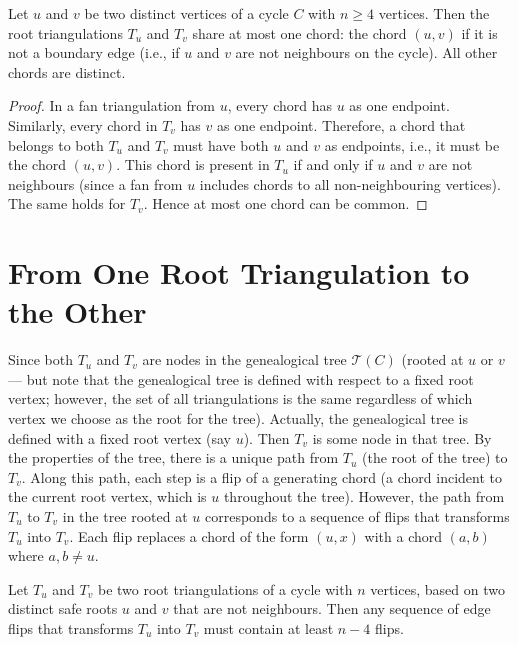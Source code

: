 \begin{lemma}
    \label{lem:chord_difference}
    Let \(u\) and \(v\) be two distinct vertices of a cycle \(C\) with \(n \ge 4\) vertices. 
    Then the root triangulations \(T_u\) and \(T_v\) share at most one chord: the chord \((u, v)\) if it is not a boundary edge (i.e., if \(u\) and \(v\) are not neighbours on the cycle). 
    All other chords are distinct.
\end{lemma}

\begin{proof}
    In a fan triangulation from \(u\), every chord has \(u\) as one endpoint. 
    Similarly, every chord in \(T_v\) has \(v\) as one endpoint. 
    Therefore, a chord that belongs to both \(T_u\) and \(T_v\) must have both \(u\) and \(v\) as endpoints, i.e., it must be the chord \((u, v)\). 
    This chord is present in \(T_u\) if and only if \(u\) and \(v\) are not neighbours (since a fan from \(u\) includes chords to all non-neighbouring vertices). 
    The same holds for \(T_v\). 
    Hence at most one chord can be common.
\end{proof}

\section{From One Root Triangulation to the Other}
\label{sec:path_between_roots}

Since both \(T_u\) and \(T_v\) are nodes in the genealogical tree \(\mathcal{T}(C)\) (rooted at \(u\) or \(v\) — but note that the genealogical tree is defined with respect to a fixed root vertex; however, the set of all triangulations is the same regardless of which vertex we choose as the root for the tree). 
Actually, the genealogical tree is defined with a fixed root vertex (say \(u\)). 
Then \(T_v\) is some node in that tree. 
By the properties of the tree, there is a unique path from \(T_u\) (the root of the tree) to \(T_v\). 
Along this path, each step is a flip of a generating chord (a chord incident to the current root vertex, which is \(u\) throughout the tree). 
However, the path from \(T_u\) to \(T_v\) in the tree rooted at \(u\) corresponds to a sequence of flips that transforms \(T_u\) into \(T_v\). 
Each flip replaces a chord of the form \((u, x)\) with a chord \((a, b)\) where \(a, b \neq u\).

\begin{lemma}
    \label{lem:min_flips}
    Let \(T_u\) and \(T_v\) be two root triangulations of a cycle with \(n\) vertices, based on two distinct safe roots \(u\) and \(v\) that are not neighbours. 
    Then any sequence of edge flips that transforms \(T_u\) into \(T_v\) must contain at least \(n-4\) flips.
\end{lemma}


